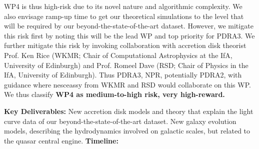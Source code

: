 \smallskip
\smallskip
\noindent
WP4 is thus high-risk
due to its novel nature and algorithmic complexity.  We also envisage
ramp-up time to get our theoretical simulations to the level that will
be required by our beyond-the-state-of-the-art dataset.  However, we
mitigate this risk first by noting this will be the lead WP and top
priority for PDRA3.  We further mitigate this risk by invoking
collaboration with accretion disk theorist Prof. Ken Rice (WKMR; Chair
of Computational Astrophysics at the IfA, University of Edinburgh) and
Prof. Romeel Dave (RSD; Chair of Physics in the IfA, University of
Edinburgh).
Thus PDRA3, NPR, potentially PDRA2, with guidance where nesceassy from
WKMR and RSD would collaborate on this WP.  We thus classify {\bf WP4
as medium-to-high risk, very high-reward.}  

\smallskip
\smallskip
\noindent
{\bf Key Deliverables:}
New accretion disk models and theory that explain the light curve data
of our beyond-the-state-of-the-art dataset.  New galaxy evolution
models, describing the hydrodynamics involved on galactic scales, but
related to the quasar central engine. {\bf Timeline:} 



